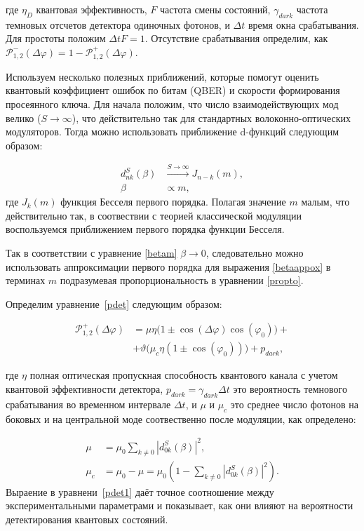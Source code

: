 где $\eta_D$ квантовая эффективность, $F$ частота смены состояний, $\gamma_{dark}$ частота темновых отсчетов детектора одиночных фотонов, и $\Delta t$ время окна срабатывания. Для простоты положим $\Delta t F=1$. Отсутствие срабатывания определим, как $\mathcal{P}_{1,2}^{-}(\Delta\varphi)=1-\mathcal{P}_{1,2}^{+}(\Delta\varphi)$.     


Используем несколько полезных приближений, которые помогут оценить квантовый коэффициент ошибок по битам (QBER) и скорости формирования просеянного ключа. Для начала положим, что число взаимодействующих мод велико ($S\rightarrow \infty$), что действительно так для стандартных волоконно-оптических модуляторов. Тогда можно использовать приближение d-функций следующим образом:

\begin{align}
d_{nk}^S(\beta) &\xrightarrow{S\rightarrow \infty} J_{n-k}(m), \label{limdj} \\
\beta &\propto m, \label{propto}
\end{align}
где $J_k(m)$ функция Бесселя первого порядка. Полагая значение $m$ малым, что действительно так, в соотвествии с теорией классической модуляции воспользуемся приближением первого порядка функции Бесселя. 


Так в соответствии с уравнение \ref{betam} $\beta \rightarrow 0$, следовательно можно использовать аппроксимации первого порядка для выражения \ref{betaappox} в терминах $m$ подразумевая пропорциональность в уравнении \ref{propto}.


Определим уравнение~\ref{pdet} следующим образом:

\begin{align}\label{pdet1}
 \mathcal{P}_{1,2}^{+}(\Delta\varphi)&=\mu\eta\Big(1\pm\cos(\Delta\varphi)\cos(\varphi_0)\Big)+ \nonumber
 \\
 &+\vartheta\Big(\mu_c\eta(1\pm\cos(\varphi_0))\Big)+p_{dark},
\end{align}


где $\eta$ полная оптическая пропускная способность квантового канала с учетом квантовой эффективности детектора, $p_{dark}=\gamma_{dark}\Delta t$ это вероятность темнового срабатывания во временном интервале $\Delta t$, и $\mu$ и $\mu_c$ это среднее число фотонов на боковых и на центральной моде соотвественно после модуляции, как определено:

\begin{align}
    \mu&=\mu_0\sum_{k\neq 0}|d_{0k}^{S}(\beta)|^2, \\
    \mu_c&=\mu_0-\mu=\mu_0(1-\sum_{k\neq 0}|d_{0k}^{S}(\beta)|^2).
\end{align}
Выраение в уравнени~\ref{pdet1} даёт точное соотношение между экспериментальными параметрами и показывает, как они влияют на вероятности детектирования квантовых состояний. 


